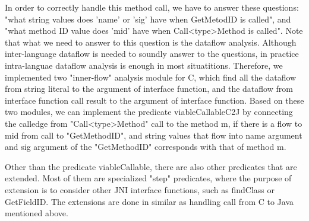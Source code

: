 In order to correctly handle this method call, we have to answer these
questions: "what string values does 'name' or 'sig' have when GetMetodID is
called", and "what method ID value does 'mid' have when Call<type>Method is
called". Note that what we need to answer to this question is the dataflow
analysis. Although inter-language dataflow is needed to soundly answer to the
questions, in practice intra-languae dataflow analysis is enough in most
situatitions. Therefore, we implemented two "inner-flow" analysis module for C,
which find all the dataflow from string literal to the argument of interface
function, and the dataflow from interface function call result to the argument
of interface function. Based on these two modules, we can implement the
predicate viableCallableC2J by connecting the calledge from "Call<type>Method"
call to the method m, if there is a flow to mid from call to "GetMethodID", and
string values that flow into name argument and sig argument of the "GetMethodID"
corresponds with that of method m.

Other than the predicate viableCallable, there are also other predicates that
are extended. Most of them are specialized "step" predicates, where the purpose
of extension is to consider other JNI interface functions, such as
findClass or GetFieldID. The extensions are done in similar as handling
call from C to Java mentioned above.
